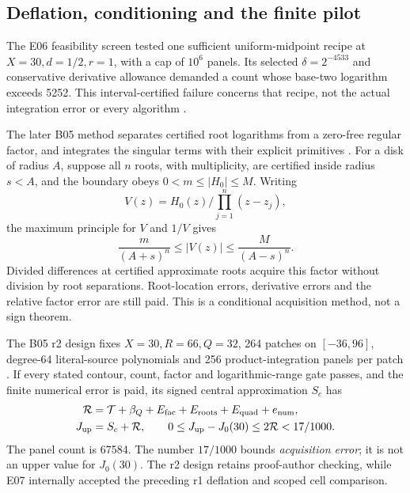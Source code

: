 \subsection{Deflation, conditioning and the finite pilot}

The E06 feasibility screen tested one sufficient uniform-midpoint
recipe at \(X=30,d=1/2,r=1\), with a cap of \(10^6\) panels.
Its selected \(\delta=2^{-4533}\) and conservative derivative
allowance demanded a count whose base-two logarithm exceeds 5252.
This interval-certified failure concerns that recipe, not the actual
integration error or every algorithm \cite{OGMidpoint}.

The later B05 method separates certified root logarithms from a
zero-free regular factor, and integrates the singular terms with
their explicit primitives \cite{OGDeflation,OGDeflationAssessment}.
For a disk of radius \(A\), suppose all \(n\) roots, with multiplicity,
are certified inside radius \(s<A\), and the boundary obeys
\(0<m\le|H_0|\le M\). Writing
\[
 V(z)=H_0(z)\Big/\prod_{j=1}^n(z-z_j),
\]
the maximum principle for \(V\) and \(1/V\) gives
\begin{equation}\label{eq:deflated-floor}
 \frac{m}{(A+s)^n}\le |V(z)|\le\frac{M}{(A-s)^n}.
\end{equation}
Divided differences at certified approximate roots acquire this factor
without division by root separations. Root-location errors, derivative
errors and the relative factor error are still paid. This is a
conditional acquisition method, not a sign theorem.

The B05 r2 design fixes \(X=30,R=66,Q=32\), 264 patches on
\([-36,96]\), degree-64 literal-source polynomials and 256
product-integration panels per patch \cite{OGContourDesign}.
If every stated contour, count, factor and logarithmic-range gate
passes, and the finite numerical error is paid, its signed central
approximation \(S_c\) has
\begin{align}\label{eq:deflated-ledger}
 \mathcal R&=\mathcal T+\beta_Q+E_{\rm fac}+E_{\rm roots}
                     +E_{\rm quad}+e_{\rm num},\nonumber\\
 J_{\rm up}&=S_c+\mathcal R,\qquad
 0\le J_{\rm up}-J_0(30)\le2\mathcal R<17/1000.
\end{align}
The panel count is 67584. The number \(17/1000\) bounds
\emph{acquisition error}; it is not an upper value for \(J_0(30)\).
The r2 design retains proof-author checking, while E07 internally
accepted the preceding r1 deflation and scoped cell comparison.

